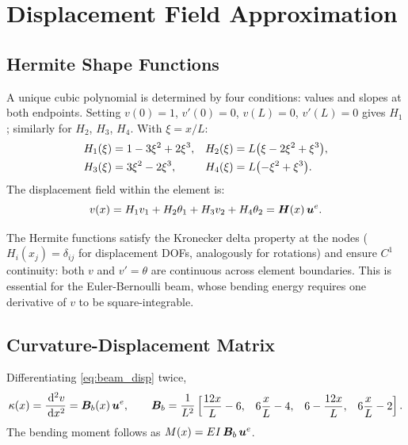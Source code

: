 \section{Displacement Field Approximation}
\label{sec:beam_displacement}

\subsection{Hermite Shape Functions}

A unique cubic polynomial is determined by four conditions: values and slopes
at both endpoints. Setting $v(0) = 1$, $v'(0) = 0$, $v(L) = 0$, $v'(L) = 0$
gives $H_1$; similarly for $H_2$, $H_3$, $H_4$. With $\xi = x/L$:
\begin{align}
    H_1(\xi) &= 1 - 3\xi^2 + 2\xi^3 , &
    H_2(\xi) &= L\bigl(\xi - 2\xi^2 + \xi^3\bigr) , \notag \\
    H_3(\xi) &= 3\xi^2 - 2\xi^3 , &
    H_4(\xi) &= L\bigl(-\xi^2 + \xi^3\bigr) .
    \label{eq:hermite}
\end{align}
The displacement field within the element is:
\begin{equation}
    v(x) = H_1 v_1 + H_2 \theta_1 + H_3 v_2 + H_4 \theta_2
         = \bm{H}(x)\,\bm{u}^e .
    \label{eq:beam_disp}
\end{equation}

\begin{remark}
The Hermite functions satisfy the Kronecker delta property at the nodes
($H_i(x_j) = \delta_{ij}$ for displacement DOFs, analogously for rotations)
and ensure $C^1$ continuity: both $v$ and $v' = \theta$ are continuous across
element boundaries. This is essential for the Euler-Bernoulli beam, whose
bending energy requires one derivative of $v$ to be square-integrable.
\end{remark}

\subsection{Curvature-Displacement Matrix}

Differentiating \cref{eq:beam_disp} twice,
\begin{equation}
    \kappa(x) = \frac{\,\mathrm{d}^2 v}{\,\mathrm{d} x^2}
    = \bm{B}_b(x)\,\bm{u}^e ,
    \qquad
    \bm{B}_b = \frac{1}{L^2}
    \begin{bmatrix}
        \dfrac{12x}{L} - 6 , &
        6\dfrac{x}{L} - 4  , &
        6 - \dfrac{12x}{L} , &
        6\dfrac{x}{L} - 2
    \end{bmatrix} .
    \label{eq:beam_Bb}
\end{equation}
The bending moment follows as $M(x) = EI\,\bm{B}_b\,\bm{u}^e$.

